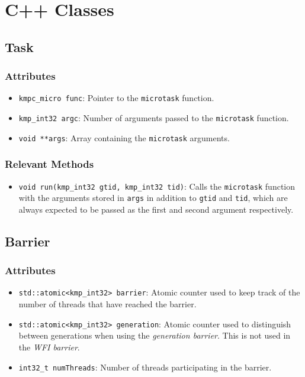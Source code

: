 \section{C++ Classes}
\label{sec:cpp-classes}

\subsection{Task}
\label{subsec:task}

\subsubsection{Attributes}

\begin{itemize}
	\item \texttt{kmpc_micro func}: Pointer to the \texttt{microtask} function.
	\item \texttt{kmp_int32 argc}: Number of arguments passed to the \texttt{microtask} function.
	\item \texttt{void **args}: Array containing the \texttt{microtask} arguments.
\end{itemize}

\subsubsection{Relevant Methods}

\begin{itemize}
	\item \texttt{void run(kmp_int32 gtid, kmp_int32 tid)}: Calls the \texttt{microtask} function
	      with the arguments stored in \texttt{args} in addition to \texttt{gtid} and \texttt{tid},
	      which are always expected to be passed as the first and second argument respectively.
\end{itemize}

\subsection{Barrier}
\label{subsec:barrier}

\subsubsection{Attributes}
\begin{itemize}
	\item \texttt{std::atomic<kmp_int32> barrier}: Atomic counter used to keep track of the number of
	      threads that have reached the barrier.
	\item \texttt{std::atomic<kmp_int32> generation}: Atomic counter used to distinguish between
	      generations when using the \emph{generation barrier}. This is not used in the \emph{WFI
		      barrier}.
	\item \texttt{int32_t numThreads}: Number of threads participating in the barrier.
\end{itemize}

